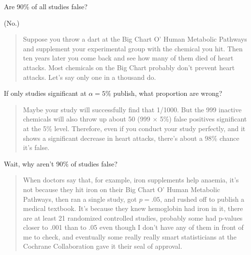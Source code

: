 \begin{frame}{Are 90\% of all studies false?}

        (No.)

    \vspace{2em}
    \pause

    \begin{quote}
        \small
        Suppose you throw a dart at the Big Chart O' Human Metabolic Pathways and supplement your experimental group with the chemical you hit. Then ten years later you come back and see how many of them died of heart attacks.
        Most chemicals on the Big Chart probably don't prevent heart attacks. Let's say only one in a thousand do. 
    \end{quote}

    \vspace{1em}

    If only studies significant at $\alpha=5\%$ publish,
    what proportion are wrong?

    \vspace{1em}
        
    \begin{quote}
        \pause Maybe your study will successfully find that 1/1000. But the 999 inactive chemicals will also throw up about 50 (999 $\times$ 5\%) false positives significant at the 5\% level. Therefore, even if you conduct your study perfectly, and it shows a significant decrease in heart attacks, there's about a 98\% chance it's false.
    \end{quote}


\end{frame}

\begin{frame}{Wait, why aren't 90\% of studies false?}
        \begin{quote}
    When doctors say that, for example, iron supplements help anaemia, it's not because they hit iron on their Big Chart O' Human Metabolic Pathways, then ran a single study, got $p = .05$, and rushed off to publish a medical textbook. It's because they knew hemoglobin had iron in it, there are at least 21 randomized controlled studies, probably some had p-values closer to .001 than to .05 even though I don't have any of them in front of me to check, and eventually some really really smart statisticians at the Cochrane Collaboration gave it their seal of approval. 
    \end{quote}

\end{frame}
